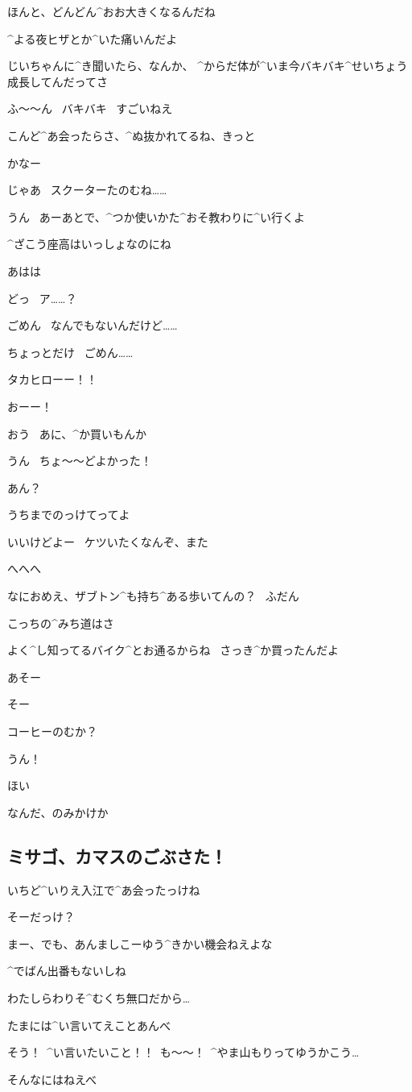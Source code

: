 \A ほんと、どんどん^{おお}{大}きくなるんだね

\T ^{よる}{夜}ヒザとか^{いた}{痛}いんだよ

\T じいちゃんに^{き}{聞}いたら、なんか、
^{からだ}{体}が^{いま}{今}バキバキ^{せいちょう}{成長}してんだってさ

\page
\A ふ〜〜ん
\ バキバキ
\ すごいねえ

\A こんど^{あ}{会}ったらさ、^{ぬ}{抜}かれてるね、きっと

\T かなー

\A じゃあ
\ スクーターたのむね……

\T うん
\ あーあとで、^{つか}{使}いかた^{おそ}{教}わりに^{い}{行}くよ

\page
\A ^{ざこう}{座高}はいっしょなのにね

\T あはは

\page
\T どっ
\ ア……？

\page
\A ごめん
\ なんでもないんだけど……

\A ちょっとだけ
\ ごめん……

\page
\M タカヒローー！！

\page
\M おーー！

\T おう
\ あに、^{か}{買}いもんか

\M うん
\ ちょ〜〜どよかった！

\T あん？

\M うちまでのっけてってよ

\page
\T いいけどよー
\ ケツいたくなんぞ、また

\M へへへ

\T なにおめえ、ザブトン^{も}{持}ち^{ある}{歩}いてんの？
\ ふだん

\M こっちの^{みち}{道}はさ

\M よく^{し}{知}ってるバイク^{とお}{通}るからね
\ さっき^{か}{買}ったんだよ

\page
\T あそー

\M そー

\T コーヒーのむか？

\M うん！

\page
\T ほい

\M なんだ、のみかけか


\subsection{ミサゴ、カマスのごぶさた！}

 いちど^{いりえ}{入江}で^{あ}{会}ったっけね

 そーだっけ？

 まー、でも、あんましこーゆう^{きかい}{機会}ねえよな

 ^{でばん}{出番}もないしね

 わたしらわりそ^{むくち}{無口}だから…

 たまには^{い}{言}いてえことあんべ

 そう！\ ^{い}{言}いたいこと！！\ も〜〜！\ ^{やま}{山}もりってゆうかこう…

 そんなにはねえべ

